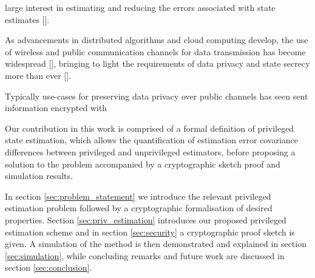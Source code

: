 \documentclass[conference]{IEEEtran}
\theoremstyle{definition}
\theoremstyle{definition}
\theoremstyle{remark}
\begin{document}
large interest in estimating and reducing the errors associated with state estimates [].

As advancements in distributed algorithms and cloud computing develop, the use of wireless and public communication channels for data transmission has become widespread [], bringing to light the requirements of data privacy and state secrecy more than ever [].

Typically use-cases for preserving data privacy over public channels has seen sent information encrypted with 









Our contribution in this work is comprised of a formal definition of privileged state estimation, which allows the quantification of estimation error covariance differences between privileged and unprivileged estimators, before proposing a solution to the problem accompanied by a cryptographic sketch proof and simulation results.

In section \ref{sec:problem_statement} we introduce the relevant privileged estimation problem followed by a cryptographic formalisation of desired properties. Section \ref{sec:priv_estimation} introduces our proposed privileged estimation scheme and in section \ref{sec:security} a cryptographic proof sketch is given. A simulation of the method is then demonstrated and explained in section \ref{sec:simulation}, while concluding remarks and future work are discussed in section \ref{sec:conclusion}.

% 
% 
\end{document}
